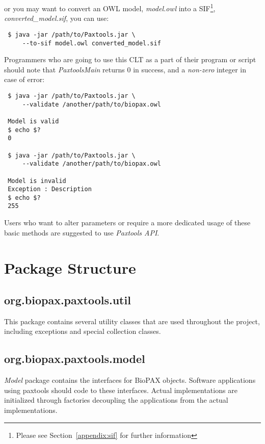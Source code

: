 \documentclass[10pt]{article}
\newenvironment{mylisting}
{\begin{list}{}{\setlength{\leftmargin}{2em}}\item\small\bfseries}
{\end{list}}
\begin{document}
or you may want to convert an OWL model, \emph{model.owl} into a SIF\footnote{Please see Section~\ref{appendix:sif} for further information}, \emph{converted\_model.sif}, you can use:
\begin{mylisting}
\begin{verbatim}
 $ java -jar /path/to/Paxtools.jar \
     --to-sif model.owl converted_model.sif
\end{verbatim}
\end{mylisting}

Programmers who are going to use this CLT as a part of their program or script should note that \textit{PaxtoolsMain} returns $0$ in success, and a \textit{non-zero} integer in case of error:

\begin{mylisting}
\begin{verbatim}
 $ java -jar /path/to/Paxtools.jar \
     --validate /another/path/to/biopax.owl

 Model is valid
 $ echo $?
 0

 $ java -jar /path/to/Paxtools.jar \
     --validate /another/path/to/biopax.owl

 Model is invalid
 Exception : Description
 $ echo $?
 255
\end{verbatim}
\end{mylisting}

Users who want to alter parameters or require a more dedicated usage of these basic methods are suggested to use \textit{Paxtools API}.

\section{Package Structure}
\subsection{org.biopax.paxtools.util}
This package contains several utility classes that are used throughout the project, including exceptions and special collection classes.

\subsection{org.biopax.paxtools.model}
\emph{Model} package contains the interfaces for BioPAX objects. Software applications using paxtools should code to these interfaces. Actual implementations are initialized through factories decoupling the applications from the actual implementations.
\end{document}
